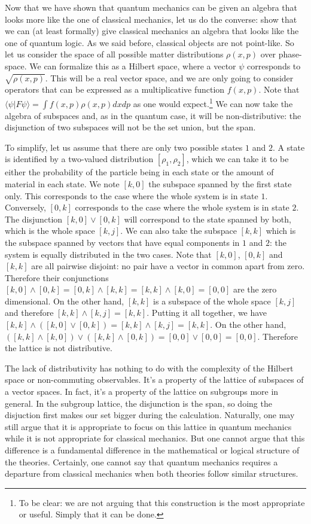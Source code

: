 \documentclass[11pt, executivepaper]{article}
\begin{document}
Now that we have shown that quantum mechanics can be given an algebra that looks more like the one of classical mechanics, let us do the converse: show that we can (at least formally) give classical mechanics an algebra that looks like the one of quantum logic. As we said before, classical objects are not point-like. So let us consider the space of all possible matter distributions $\rho(x,p)$ over phase-space. We can formalize this as a Hilbert space, where a vector $\psi$ corresponds to $\sqrt{\rho(x,p)}$. This will be a real vector space, and we are only going to consider operators that can be expressed as a multiplicative function $f(x,p)$. Note that $\langle \psi | F \psi \rangle = \int f(x,p) \rho(x,p) dx dp$ as one would expect.\footnote{To be clear: we are not arguing that this construction is the most appropriate or useful. Simply that it can be done.}  We can now take the algebra of subspaces and, as in the quantum case, it will be non-distributive: the disjunction of two subspaces will not be the set union, but the span.

To simplify, let us assume that there are only two possible states $1$ and $2$. A state is identified by a two-valued distribution $[\rho_1, \rho_2]$, which we can take it to be either the probability of the particle being in each state or the amount of material in each state. We note $[k,0]$ the subspace spanned by the first state only. This corresponds to the case where the whole system is in state $1$. Conversely, $[0,k]$ corresponds to the case where the whole system is in state $2$. The disjunction $[k,0] \vee [0,k]$ will correspond to the state spanned by both, which is the whole space $[k,j]$. We can also take the subspace $[k,k]$ which is the subspace spanned by vectors that have equal components in $1$ and $2$: the system is equally distributed in the two cases. Note that $[k,0]$, $[0,k]$ and $[k,k]$ are all pairwise disjoint: no pair have a vector in common apart from zero. Therefore their conjunctions $[k,0] \wedge [0,k] = [0,k] \wedge [k,k] = [k,k] \wedge [k,0] = [0,0]$ are the zero dimensional. On the other hand, $[k,k]$ is a subspace of the whole space $[k,j]$ and therefore $[k,k] \wedge [k,j] = [k,k]$. Putting it all together, we have $[k,k] \wedge ( [k,0] \vee [0,k] ) = [k,k] \wedge [k,j] = [k,k]$. On the other hand, $( [k,k] \wedge [k,0] ) \vee ( [k,k] \wedge [0,k] ) = [0,0] \vee [0,0] = [0,0]$. Therefore the lattice is not distributive.

The lack of distributivity has nothing to do with the complexity of the Hilbert space or non-commuting observables. It's a property of the lattice of subspaces of a vector spaces. In fact, it's a property of the lattice on subgroups more in general. In the subgroup lattice, the disjunction is the span, so doing the disjuction first makes our set bigger during the calculation. Naturally, one may still argue that it is appropriate to focus on this lattice in quantum mechanics while it is not appropriate for classical mechanics. But one cannot argue that this difference is a fundamental difference in the mathematical or logical structure of the theories. Certainly, one cannot say that quantum mechanics requires a departure from classical mechanics when both theories follow similar structures.
\end{document}
